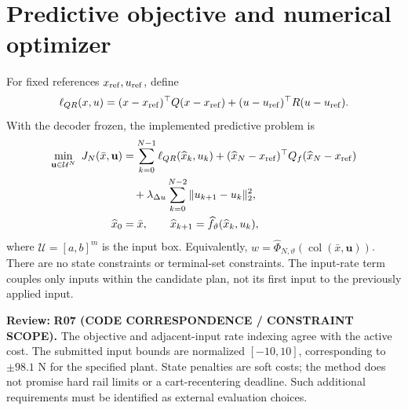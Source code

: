 \documentclass[11pt]{article}
\newcommand{\col}{\operatorname{col}}
\newcommand{\review}[1]{\par\noindent\textcolor{red!70!black}{\textbf{Review:} #1}\par}
\begin{document}
\section{Predictive objective and numerical optimizer}
For fixed references $x_{\rm ref},u_{\rm ref}$, define
\begin{equation}\label{eq:stage}
\ell_{QR}(x,u)=(x-x_{\rm ref})^\top Q(x-x_{\rm ref})+(u-u_{\rm ref})^\top R(u-u_{\rm ref}).
\end{equation}
With the decoder frozen, the implemented predictive problem is
\begin{equation}\label{eq:mpc}
\begin{aligned}
\min_{\mathbf u\in\mathcal U^N}\ J_N(\bar x,\mathbf u)
&=\sum_{k=0}^{N-1}\ell_{QR}(\widehat x_k,u_k)
 +(\widehat x_N-x_{\rm ref})^\top Q_f(\widehat x_N-x_{\rm ref})\\
&\quad+\lambda_{\Delta u}\sum_{k=0}^{N-2}\|u_{k+1}-u_k\|_2^2,\\
\widehat x_0&=\bar x,\qquad \widehat x_{k+1}=\widehat f_\vartheta(\widehat x_k,u_k),
\end{aligned}
\end{equation}
where $\mathcal U=[a,b]^m$ is the input box. Equivalently, $w=\widehat\Phi_{N,\vartheta}(\col(\bar x,\mathbf u))$. There are no state constraints or terminal-set constraints. The input-rate term couples only inputs within the candidate plan, not its first input to the previously applied input.
\review{\textbf{R07 (CODE CORRESPONDENCE / CONSTRAINT SCOPE).} The objective and adjacent-input rate indexing agree with the active cost. The submitted input bounds are normalized $[-10,10]$, corresponding to $\pm98.1$ N for the specified plant. State penalties are soft costs; the method does not promise hard rail limits or a cart-recentering deadline. Such additional requirements must be identified as external evaluation choices.}
\end{document}
